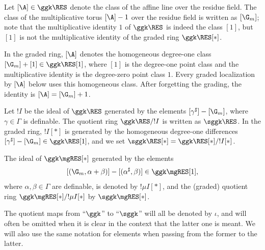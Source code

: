 \begin{nota}\label{res:note}
Let $[\A] \in \ggk \RES$ denote the class of the affine line over the residue field. The class of the multiplicative torus $[\A] - 1$ over the residue field is written as $[\G_m]$; note that the multiplicative identity $1$ of $\ggk \RES$ is indeed the class $[1]$, but $[1]$ is not the multiplicative identity of the graded ring $\ggk \RES[*]$.

{\color{SectionFourProposal}In the graded ring, $[\A]$ denotes the homogeneous degree-one class $[\G_m]+[1]\in\ggk\RES[1]$, where $[1]$ is the degree-one point class and the multiplicative identity is the degree-zero point class $1$. Every graded localization by $[\A]$ below uses this homogeneous class. After forgetting the grading, the identity is $[\A]=[\G_m]+1$.}


Let $!I$ be the ideal of $\ggk \RES$ generated by the elements $[\gamma^\sharp] - [\G_m]$, where $\gamma \in \Gamma$ is definable. The quotient ring $\ggk \RES / !I$ is written as $\sggk \RES$. {\color{SectionFourProposal}In the graded ring, $!I[*]$ is generated by the homogeneous degree-one differences $[\gamma^\sharp]-[\G_m]\in\ggk\RES[1]$, and we set $\sggk\RES[*]=\ggk\RES[*]/!I[*]$.}

The ideal of $\ggk \mgRES[*]$ generated by the  elements
\[
[(\G_m, \alpha + \beta)] - [(\alpha^\sharp, \beta)] \in \ggk \mgRES[1],
\]
where $\alpha, \beta \in \Gamma$ are definable, is denoted by $!\mu I[*]$, and the (graded) quotient ring $\ggk \mgRES[*] / !\mu I[*]$ by $\sggk \mgRES[*]$.
\end{nota}


The quotient maps from ``$\ggk$'' to ``$\sggk$'' will all be denoted by $\iota$, and will often be omitted when it is clear in the context that the latter one is meant. We will also use the same notation for elements when passing from the former to the latter.

